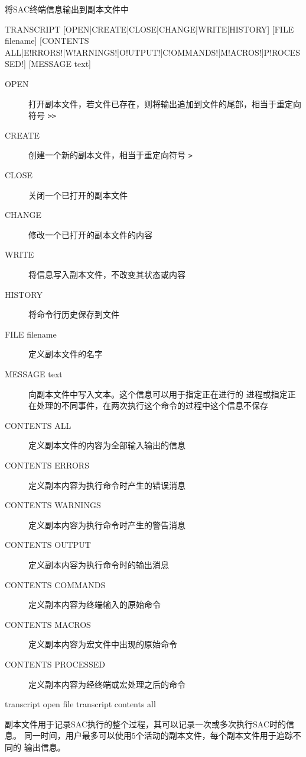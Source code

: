 \label{cmd:transcript}

将SAC终端信息输出到副本文件中

\begin{SACSTX}
TRANSCRIPT [OPEN|CREATE|CLOSE|CHANGE|WRITE|HISTORY] [FILE filename]
    [CONTENTS ALL|E!RRORS!|W!ARNINGS!|O!UTPUT!|C!OMMANDS!|M!ACROS!|P!ROCESSED!]
    [MESSAGE text]
\end{SACSTX}

\begin{description}
\item [OPEN] 打开副本文件，若文件已存在，则将输出追加到文件的尾部，相当于重定向符号 \verb|>>|
\item [CREATE] 创建一个新的副本文件，相当于重定向符号 \verb|>|
\item [CLOSE] 关闭一个已打开的副本文件
\item [CHANGE] 修改一个已打开的副本文件的内容
\item [WRITE] 将信息写入副本文件，不改变其状态或内容
\item [HISTORY] 将命令行历史保存到文件
\item [FILE filename] 定义副本文件的名字
\item [MESSAGE text] 向副本文件中写入文本。这个信息可以用于指定正在进行的
    进程或指定正在处理的不同事件，在两次执行这个命令的过程中这个信息不保存
\item [CONTENTS ALL] 定义副本文件的内容为全部输入输出的信息
\item [CONTENTS ERRORS] 定义副本内容为执行命令时产生的错误消息
\item [CONTENTS WARNINGS] 定义副本内容为执行命令时产生的警告消息
\item [CONTENTS OUTPUT] 定义副本内容为执行命令时的输出消息
\item [CONTENTS COMMANDS] 定义副本内容为终端输入的原始命令
\item [CONTENTS MACROS] 定义副本内容为宏文件中出现的原始命令
\item [CONTENTS PROCESSED] 定义副本内容为经终端或宏处理之后的命令
\end{description}

\begin{SACDFT}
transcript open file transcript contents all
\end{SACDFT}

副本文件用于记录SAC执行的整个过程，其可以记录一次或多次执行SAC时的信息。
同一时间，用户最多可以使用5个活动的副本文件，每个副本文件用于追踪不同的
输出信息。

